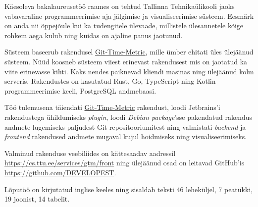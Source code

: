 Käesoleva bakalaureusetöö raames on tehtud Tallinna Tehnikaülikooli jaoks vabavaraline programmeerimise aja jälgimise ja visualiseerimise süsteem.
Eesmärk on anda nii õppejõule kui ka tudengitele ülevaade, millistele ülesannetele kõige rohkem aega kulub ning
kuidas on ajaline panus jaotunud.

Süsteem baseerub rakendusel \href{https://github.com/git-time-metric/gtm}{Git-Time-Metric}, mille ümber
ehitati üles ülejäänud süsteem.
Nüüd koosneb süsteem viiest erinevast rakendusest mis on jaotatud ka viite erinevasse kihti.
Kaks nendes paiknevad kliendi masinas ning ülejäänud kolm serveris.
Rakendustes on kasutatud Rust, Go, TypeScript ning Kotlin programmeerimise keeli, PostgreSQL andmebaasi.

Töö tulemusena täiendati \href{https://github.com/git-time-metric/gtm}{Git-Time-Metric} rakendust,
loodi Jetbrains'i rakendustega ühildumiseks \textit{plugin},
loodi \textit{Debian package}'sse pakendatud rakendus andmete lugemiseks paljudest Git repositooriumitest ning
valmistati \textit{backend} ja \textit{frontend} rakendused andmete mugaval kujul hoidmiseks ning visualiseerimiseks.

Valminud rakenduse veebiliides on kättesaadav aadressil \href{https://cs.ttu.ee/services/gtm/front}{https://cs.ttu.ee/services/gtm/front}
ning ülejäänud osad on leitavad GitHub'is \href{https://github.com/DEVELOPEST}{https://github.com/DEVELOPEST}.

Lõputöö on kirjutatud inglise keeles ning sisaldab teksti 46 leheküljel, 7 peatükki, 19 joonist, 14 tabelit.